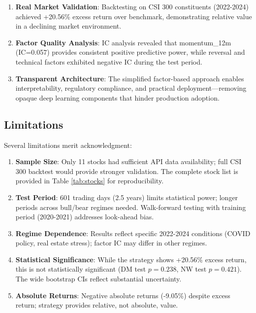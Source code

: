 \documentclass[12pt]{article}
\begin{document}
\begin{enumerate}
    \item \textbf{Real Market Validation}: Backtesting on CSI 300 constituents (2022-2024) achieved +20.56\% excess return over benchmark, demonstrating relative value in a declining market environment.

    \item \textbf{Factor Quality Analysis}: IC analysis revealed that momentum\_12m (IC=0.057) provides consistent positive predictive power, while reversal and technical factors exhibited negative IC during the test period.

    \item \textbf{Transparent Architecture}: The simplified factor-based approach enables interpretability, regulatory compliance, and practical deployment---removing opaque deep learning components that hinder production adoption.
\end{enumerate}

\subsection{Limitations}

Several limitations merit acknowledgment:

\begin{enumerate}
    \item \textbf{Sample Size}: Only 11 stocks had sufficient API data availability; full CSI 300 backtest would provide stronger validation. The complete stock list is provided in Table \ref{tab:stocks} for reproducibility.

    \item \textbf{Test Period}: 601 trading days (2.5 years) limits statistical power; longer periods across bull/bear regimes needed. Walk-forward testing with training period (2020-2021) addresses look-ahead bias.

    \item \textbf{Regime Dependence}: Results reflect specific 2022-2024 conditions (COVID policy, real estate stress); factor IC may differ in other regimes.

    \item \textbf{Statistical Significance}: While the strategy shows +20.56\% excess return, this is not statistically significant (DM test $p=0.238$, NW test $p=0.421$). The wide bootstrap CIs reflect substantial uncertainty.

    \item \textbf{Absolute Returns}: Negative absolute returns (-9.05\%) despite excess return; strategy provides relative, not absolute, value.
\end{enumerate}
\end{document}
